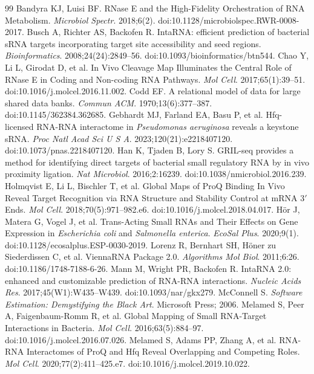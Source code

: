 \documentclass[11pt,a4paper]{article}
\begin{document}
\begin{thebibliography}{99}
 Bandyra KJ, Luisi BF. RNase E and the High-Fidelity Orchestration of RNA Metabolism. \emph{Microbiol Spectr}. 2018;6(2). doi:10.1128/microbiolspec.RWR-0008-2017.
 Busch A, Richter AS, Backofen R. IntaRNA: efficient prediction of bacterial sRNA targets incorporating target site accessibility and seed regions. \emph{Bioinformatics}. 2008;24(24):2849--56. doi:10.1093/bioinformatics/btn544.
 Chao Y, Li L, Girodat D, et al. In Vivo Cleavage Map Illuminates the Central Role of RNase E in Coding and Non-coding RNA Pathways. \emph{Mol Cell}. 2017;65(1):39--51. doi:10.1016/j.molcel.2016.11.002.
 Codd EF. A relational model of data for large shared data banks. \emph{Commun ACM}. 1970;13(6):377--387. doi:10.1145/362384.362685.
 Gebhardt MJ, Farland EA, Basu P, et al. Hfq-licensed RNA-RNA interactome in \emph{Pseudomonas aeruginosa} reveals a keystone sRNA. \emph{Proc Natl Acad Sci U S A}. 2023;120(21):e2218407120. doi:10.1073/pnas.2218407120.
 Han K, Tjaden B, Lory S. GRIL-seq provides a method for identifying direct targets of bacterial small regulatory RNA by in vivo proximity ligation. \emph{Nat Microbiol}. 2016;2:16239. doi:10.1038/nmicrobiol.2016.239.
 Holmqvist E, Li L, Bischler T, et al. Global Maps of ProQ Binding In Vivo Reveal Target Recognition via RNA Structure and Stability Control at mRNA 3$'$ Ends. \emph{Mol Cell}. 2018;70(5):971--982.e6. doi:10.1016/j.molcel.2018.04.017.
 Hör J, Matera G, Vogel J, et al. Trans-Acting Small RNAs and Their Effects on Gene Expression in \emph{Escherichia coli} and \emph{Salmonella enterica}. \emph{EcoSal Plus}. 2020;9(1). doi:10.1128/ecosalplus.ESP-0030-2019.
 Lorenz R, Bernhart SH, Höner zu Siederdissen C, et al. ViennaRNA Package 2.0. \emph{Algorithms Mol Biol}. 2011;6:26. doi:10.1186/1748-7188-6-26.
 Mann M, Wright PR, Backofen R. IntaRNA 2.0: enhanced and customizable prediction of RNA-RNA interactions. \emph{Nucleic Acids Res}. 2017;45(W1):W435--W439. doi:10.1093/nar/gkx279.
 McConnell S. \emph{Software Estimation: Demystifying the Black Art}. Microsoft Press; 2006.
 Melamed S, Peer A, Faigenbaum-Romm R, et al. Global Mapping of Small RNA-Target Interactions in Bacteria. \emph{Mol Cell}. 2016;63(5):884--97. doi:10.1016/j.molcel.2016.07.026.
 Melamed S, Adams PP, Zhang A, et al. RNA-RNA Interactomes of ProQ and Hfq Reveal Overlapping and Competing Roles. \emph{Mol Cell}. 2020;77(2):411--425.e7. doi:10.1016/j.molcel.2019.10.022.

\end{thebibliography}
\end{document}
